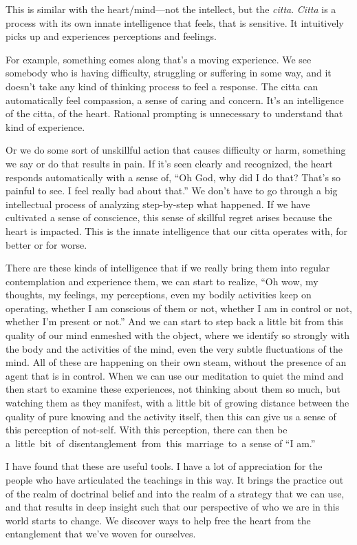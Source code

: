 This is similar with the heart/mind---not the intellect, but the \emph{citta}. \emph{Citta} is a process with its own innate intelligence that feels, that is sensitive. It intuitively picks up and experiences perceptions and feelings.

For example, something comes along that's a moving experience. We see somebody who is having difficulty, struggling or suffering in some way, and it doesn't take any kind of thinking process to feel a response. The citta can automatically feel compassion, a sense of caring and concern. It's an intelligence of the citta, of the heart. Rational prompting is unnecessary to understand that kind of experience.

Or we do some sort of unskillful action that causes difficulty or harm, something we say or do that results in pain. If it's seen clearly and recognized, the heart responds automatically with a sense of, ``Oh God, why did I do that? That's so painful to see. I feel really bad about that.'' We don't have to go through a big intellectual process of analyzing step-by-step what happened. If we have cultivated a sense of conscience, this sense of skillful regret arises because the heart is impacted. This is the innate intelligence that our citta operates with, for better or for worse.


There are these kinds of intelligence that if we really bring them into regular contemplation and experience them, we can start to realize, ``Oh wow, my thoughts, my feelings, my perceptions, even my bodily activities keep on operating, whether I am conscious of them or not, whether I am in control or not, whether I'm present or not.'' And we can start to step back a little bit from this quality of our mind enmeshed with the object, where we identify so strongly with the body and the activities of the mind, even the very subtle fluctuations of the mind. All of these are happening on their own steam, without the presence of an agent that is in control. When we can use our meditation to quiet the mind and then start to examine these experiences, not thinking about them so much, but watching them as they manifest, with a little bit of growing distance between the quality of pure knowing and the activity itself, then this can give us a sense of this perception of not-self. With this \mbox{perception}, there can then be \mbox{a little bit of disentanglement from this marriage to a} sense of ``I am.''

I have found that these are useful tools. I have a lot of \linebreak appreciation for the people who have articulated the teachings in this way. It brings the practice out of \linebreak the realm of doctrinal belief and into the realm \linebreak of a strategy that we can use, and that results in deep insight such that our perspective of who we are in this world starts to change. We discover ways to help free the heart from the entanglement that we've woven \linebreak for ourselves.


